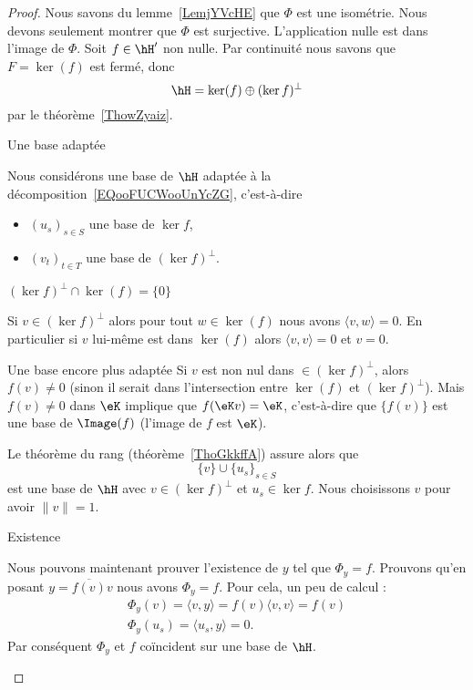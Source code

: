 \begin{proof}
	Nous savons du lemme~\ref{LemjYVcHE} que \(\Phi\) est une isométrie. Nous devons seulement montrer que \( \Phi\) est surjective. L'application nulle est dans l'image de \( \Phi\). Soit \( f\in \hH'\) non nulle. Par continuité nous savons que \( F=\ker(f)\) est fermé, donc
	\begin{equation}    \label{EQooFUCWooUnYcZG}
		\hH=\ker(f)\oplus(\ker f)^{\perp}
	\end{equation}
	par le théorème~\ref{ThowZyaiz}.

	\begin{subproof}
		\item[Une base adaptée]

		Nous considérons une base de \( \hH\) adaptée à la décomposition~\ref{EQooFUCWooUnYcZG}, c'est-à-dire
		\begin{itemize}
			\item \( (u_s)_{s\in S}\) une base de \( \ker f\),
			\item
			      \( (v_t)_{t\in T}\) une base de \( (\ker f)^{\perp}\).
		\end{itemize}

		\item[\( (\ker f)^{\perp}\cap\ker(f)=\{ 0 \}  \)]

		Si \( v\in (\ker f)^{\perp}\) alors pour tout \( w\in \ker(f)\) nous avons \( \langle v, w\rangle =0\). En particulier si \( v\) lui-même est dans \( \ker(f)\) alors \( \langle v, v\rangle =0\) et \( v=0\).

		\item[Une base encore plus adaptée]
		Si \( v\) est non nul dans \( \in (\ker f)^{\perp}\), alors \( f(v)\neq 0\) (sinon il serait dans l'intersection entre \( \ker(f)\) et \( (\ker f)^{\perp}\)). Mais \( f(v)\neq 0\) dans \( \eK\) implique que \( f(\eK v)=\eK\), c'est-à-dire que \( \{ f(v) \}\) est une base de \( \Image(f)\) (l'image de \( f\) est \( \eK\)).

		Le théorème du rang (théorème~\ref{ThoGkkffA}) assure alors que
		\begin{equation}
			\{ v \}\cup\{ u_s \}_{s\in S}
		\end{equation}
		est une base de \( \hH\) avec \( v\in(\ker f)^{\perp}\) et \( u_s\in \ker f\). Nous choisissons \( v\) pour avoir \( \| v \|=1\).

		\item[Existence]

		Nous pouvons maintenant prouver l'existence de \( y\) tel que \(  \Phi_y= f\). Prouvons qu'en posant \( y=\overline{  f(v) }v\) nous avons \(  \Phi_y= f\). Pour cela, un peu de calcul :
		\begin{subequations}
			\begin{align}
				\Phi_y(v)=\langle v, y\rangle = f(v)\langle v, v\rangle = f(v) \\
				\Phi_y(u_s)=\langle u_s, y\rangle =0.
			\end{align}
		\end{subequations}
		Par conséquent \(  \Phi_y\) et \(  f\) coïncident sur une base de \( \hH\).


\end{subproof}
\end{proof}
